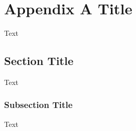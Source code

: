 \chapter{Appendix A Title}\label{appA}
Text

\section{Section Title}  %
Text

\subsection{Subsection Title} %
Text 